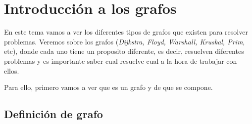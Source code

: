 \chapter{Introducción a los grafos}
En este tema vamos a ver los diferentes tipos de grafos que existen para resolver problemas.
Veremos sobre los grafos (\textit{Dijkstra, Floyd, Warshall, Kruskal, Prim}, etc), donde cada uno tiene un proposito diferente, es decir, resuelven diferentes problemas y es importante saber cual resuelve cual a la hora de trabajar con ellos.

Para ello, primero vamos a ver que es un grafo y de que se compone.
\section{Definición de grafo}
